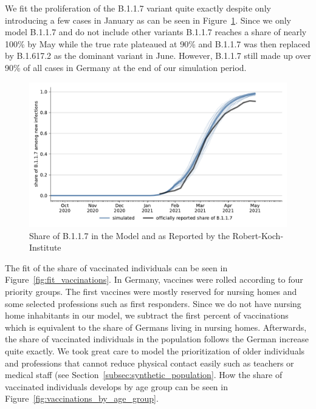 We fit the proliferation of the B.1.1.7 variant quite exactly despite only introducing a
few cases in January as can be seen in Figure~\ref{fig:fit_share_b117}. Since we only
model B.1.1.7 and do not include other variants B.1.1.7 reaches a share of nearly 100\%
by May while the true rate plateaued at 90\% and B.1.1.7 was then replaced by B.1.617.2
as the dominant variant in June. However, B.1.1.7 still made up over 90\% of all cases in
Germany at the end of our simulation period.

\begin{figure}[ht]   %
  \centering
  \includegraphics[width=\textwidth]{figures/results/figures/scenario_comparisons/combined_fit/full_share_b117_with_single_runs}
  \caption{Share of B.1.1.7 in the Model and as Reported by the Robert-Koch-Institute}
  \label{fig:fit_share_b117}
\end{figure}


The fit of the share of vaccinated individuals can be seen in
Figure~\ref{fig:fit_vaccinations}. In Germany, vaccines were rolled according to four
priority groups. The first vaccines were mostly reserved for nursing homes and some
selected professions such as first responders. Since we do not have nursing home
inhabitants in our model, we subtract the first percent of vaccinations which is
equivalent to the share of Germans living in nursing homes. Afterwards, the share of
vaccinated individuals in the population follows the German increase quite exactly. We
took great care to model the prioritization of older individuals and professions that
cannot reduce physical contact easily such as teachers or medical staff (see
Section~\ref{subsec:synthetic_population}. How the share of vaccinated individuals
develops by age group can be seen in Figure~\ref{fig:vaccinations_by_age_group}.


